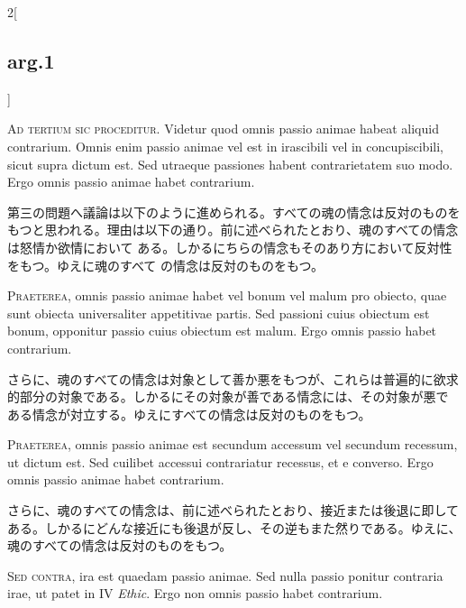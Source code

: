 \documentclass[paper=a4paper,fontsize=10pt,jafontsize=9pt,titlepage]{jlreq}
\begin{document}
\begin{paracol}{2}[\subsection{arg.1}]

{\scshape Ad tertium sic proceditur}. Videtur quod omnis passio animae habeat
 aliquid contrarium. Omnis enim passio animae vel est in irascibili vel
 in concupiscibili, sicut supra dictum est. Sed utraeque passiones
 habent contrarietatem suo modo. Ergo omnis passio animae habet
 contrarium.

\switchcolumn

第三の問題へ議論は以下のように進められる。すべての魂の情念は反対のものを
 もつと思われる。理由は以下の通り。前に述べられたとおり、魂のすべての情念は怒情か欲情において
 ある。しかるにちらの情念もそのあり方において反対性をもつ。ゆえに魂のすべて
 の情念は反対のものをもつ。

\switchcolumn*

{\scshape Praeterea}, omnis passio animae habet vel bonum vel malum pro obiecto,
 quae sunt obiecta universaliter appetitivae partis. Sed passioni cuius
 obiectum est bonum, opponitur passio cuius obiectum est malum. Ergo
 omnis passio habet contrarium.

\switchcolumn

さらに、魂のすべての情念は対象として善か悪をもつが、これらは普遍的に欲求
 的部分の対象である。しかるにその対象が善である情念には、その対象が悪で
 ある情念が対立する。ゆえにすべての情念は反対のものをもつ。

\switchcolumn*

{\scshape Praeterea}, omnis passio animae est secundum accessum vel secundum
 recessum, ut dictum est. Sed cuilibet accessui contrariatur recessus,
 et e converso. Ergo omnis passio animae habet contrarium.

\switchcolumn

さらに、魂のすべての情念は、前に述べられたとおり、接近または後退に即して
 ある。しかるにどんな接近にも後退が反し、その逆もまた然りである。ゆえに、
 魂のすべての情念は反対のものをもつ。

\switchcolumn*[\subsection{s.c.}]

{\scshape Sed contra}, ira est quaedam passio animae. Sed nulla passio ponitur
 contraria irae, ut patet in IV {\itshape Ethic}. Ergo non omnis passio habet
 contrarium.


\end{paracol}
\end{document}
